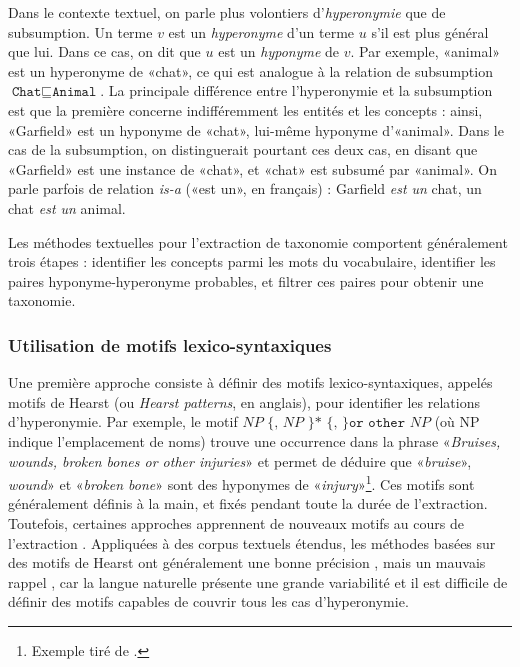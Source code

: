 
Dans le contexte textuel, on parle plus volontiers d'\textit{hyperonymie} que de subsumption. Un terme $v$ est un \textit{hyperonyme} d'un terme $u$ s'il est plus général que lui. Dans ce cas, on dit que $u$ est un \textit{hyponyme} de $v$. Par exemple, «animal» est un hyperonyme de «chat», ce qui est analogue à la relation de subsumption $\texttt{Chat} \sqsubseteq \texttt{Animal}$. La principale différence entre l'hyperonymie et la subsumption est que la première concerne indifféremment les entités et les concepts : ainsi, «Garfield» est un hyponyme de «chat», lui-même hyponyme d'«animal». Dans le cas de la subsumption, on distinguerait pourtant ces deux cas, en disant que «Garfield» est une instance de «chat», et «chat» est subsumé par «animal». On parle parfois de relation \textit{is-a} («est un», en français) : Garfield \textit{est un} chat, un chat \textit{est un} animal.

Les méthodes textuelles pour l'extraction de taxonomie comportent généralement trois étapes : identifier les concepts parmi les mots du vocabulaire, identifier les paires hyponyme-hyperonyme probables, et filtrer ces paires pour obtenir une taxonomie.


\subsubsection{Utilisation de motifs lexico-syntaxiques}

Une première approche consiste à définir des motifs lexico-syntaxiques, appelés motifs de Hearst \cite{hearst1992automatic} (ou \textit{Hearst patterns}, en anglais), pour identifier les relations d'hyperonymie. Par exemple, le motif $NP \texttt{ \{, } NP \texttt{ \}* \{, \} or other } NP$ (où NP indique l'emplacement de noms) trouve une occurrence dans la phrase «\textit{Bruises, wounds, broken bones or other injuries}» et permet de déduire que «\textit{bruise}», \textit{wound}» et «\textit{broken bone}» sont des hyponymes de «\textit{injury}»\footnote{Exemple tiré de \cite{hearst1992automatic}.}.
Ces motifs sont généralement définis à la main, et fixés pendant toute la durée de l'extraction. Toutefois, certaines approches apprennent de nouveaux motifs au cours de l'extraction \cite{snow2005learning, shwartz-etal-2016-improving}. Appliquées à des corpus textuels étendus, les méthodes basées sur des motifs de Hearst ont généralement une bonne précision \cite{roller-etal-2018-hearst}, mais un mauvais rappel \cite{wu2008automatically}, car la langue naturelle présente une grande variabilité et il est difficile de définir des motifs capables de couvrir tous les cas d'hyperonymie.

